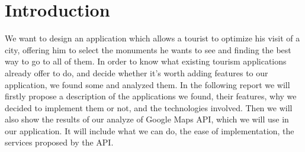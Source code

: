 \section{Introduction}

We want to design an application which allows a tourist to optimize his visit of a city, offering him to select the monuments he wants to see and finding the best way to go to all of them. In order to know what existing tourism applications already offer to do, and decide whether it's worth adding features to our application, we found some and analyzed them. In the following report we will firstly propose a description of the applications we found, their features, why we decided to implement them or not, and the technologies involved.
Then we will also show the results of our analyze of Google Maps API, which we will use in our application. It will include what we can do, the ease of implementation, the services proposed by the API.

